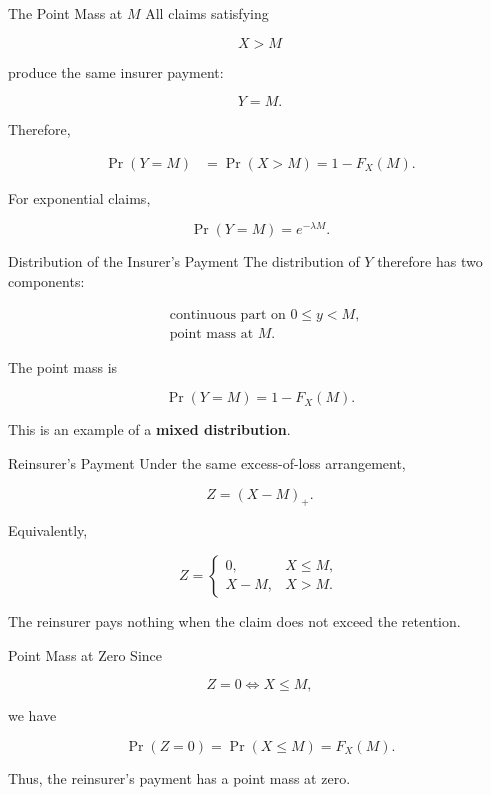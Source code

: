 \documentclass[
  ignorenonframetext,
  aspectratio=169,
]{beamer}
\begin{document}
\begin{frame}{The Point Mass at \(M\)}
\protect{}\label{the-point-mass-at-m}
All claims satisfying

\[
X>M
\]

produce the same insurer payment:

\[
Y=M.
\]

Therefore,

\[
\begin{aligned}
\Pr(Y=M)
&=\Pr(X>M) =1-F_X(M).
\end{aligned}
\]

For exponential claims,

\[
\boxed{
\Pr(Y=M)=e^{-\lambda M}.
}
\]
\end{frame}

\begin{frame}{Distribution of the Insurer's Payment}
\protect{}\label{distribution-of-the-insurers-payment-2}
The distribution of \(Y\) therefore has two components:

\[
\boxed{
\begin{aligned}
&\text{continuous part on }0\leq y<M,\\
&\text{point mass at }M.
\end{aligned}
}
\]

The point mass is

\[
\Pr(Y=M)=1-F_X(M).
\]

This is an example of a \textbf{mixed distribution}.
\end{frame}

\begin{frame}{Reinsurer's Payment}
\protect{}\label{reinsurers-payment}
Under the same excess-of-loss arrangement,

\[
\boxed{
Z=(X-M)_+.
}
\]

Equivalently,

\[
Z=
\begin{cases}
0, & X\leq M,\\
X-M, & X>M.
\end{cases}
\]

The reinsurer pays nothing when the claim does not exceed the retention.
\end{frame}

\begin{frame}{Point Mass at Zero}
\protect{}\label{point-mass-at-zero}
Since

\[
Z=0
\iff
X\leq M,
\]

we have

\[
\boxed{
\Pr(Z=0)
=
\Pr(X\leq M)
=
F_X(M).
}
\]

Thus, the reinsurer's payment has a point mass at zero.
\end{frame}
\end{document}
